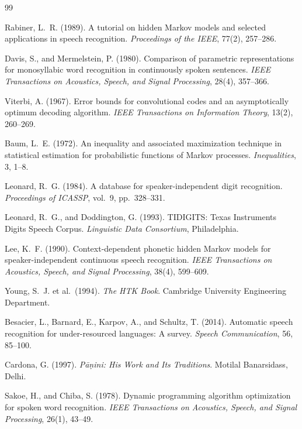 \documentclass[12pt,a4paper]{article}
\begin{document}
\newpage

\begin{thebibliography}{99}

Rabiner, L.~R. (1989).
A tutorial on hidden Markov models and selected applications in speech recognition.
\textit{Proceedings of the IEEE}, 77(2), 257--286.

Davis, S., and Mermelstein, P. (1980).
Comparison of parametric representations for monosyllabic word recognition
in continuously spoken sentences.
\textit{IEEE Transactions on Acoustics, Speech, and Signal Processing},
28(4), 357--366.

Viterbi, A. (1967).
Error bounds for convolutional codes and an asymptotically optimum decoding algorithm.
\textit{IEEE Transactions on Information Theory}, 13(2), 260--269.

Baum, L.~E. (1972).
An inequality and associated maximization technique in statistical estimation
for probabilistic functions of Markov processes.
\textit{Inequalities}, 3, 1--8.

Leonard, R.~G. (1984).
A database for speaker-independent digit recognition.
\textit{Proceedings of ICASSP}, vol.~9, pp.~328--331.

Leonard, R.~G., and Doddington, G. (1993).
TIDIGITS: Texas Instruments Digits Speech Corpus.
\textit{Linguistic Data Consortium}, Philadelphia.

Lee, K.~F. (1990).
Context-dependent phonetic hidden Markov models for speaker-independent
continuous speech recognition.
\textit{IEEE Transactions on Acoustics, Speech, and Signal Processing},
38(4), 599--609.

Young, S.~J. et al.\ (1994).
\textit{The HTK Book}.
Cambridge University Engineering Department.

Besacier, L., Barnard, E., Karpov, A., and Schultz, T. (2014).
Automatic speech recognition for under-resourced languages: A survey.
\textit{Speech Communication}, 56, 85--100.

Cardona, G. (1997).
\textit{P\={a}\d{n}ini: His Work and Its Traditions}.
Motilal Banarsidass, Delhi.

Sakoe, H., and Chiba, S. (1978).
Dynamic programming algorithm optimization for spoken word recognition.
\textit{IEEE Transactions on Acoustics, Speech, and Signal Processing},
26(1), 43--49.


\end{thebibliography}
\end{document}

